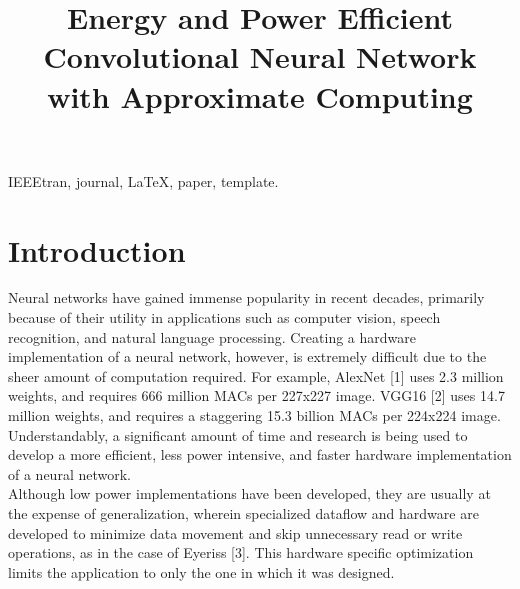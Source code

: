 \documentclass[conference]{IEEEtran}
\begin{document}
\title{Energy and Power Efficient Convolutional Neural Network with Approximate Computing}

\author{
\and
{}
}

\maketitle

\begin{abstract}
\blindtext[1]
\end{abstract}

\begin{IEEEkeywords}
IEEEtran, journal, \LaTeX, paper, template.
\end{IEEEkeywords}

\IEEEpeerreviewmaketitle

\section{Introduction}
	Neural networks have gained immense popularity in recent decades, primarily because of their utility in applications such as computer vision, speech recognition, and natural language processing. Creating a hardware implementation of a neural network, however, is extremely difficult due to the sheer amount of computation required. For example, AlexNet [1] uses 2.3 million weights, and requires 666 million MACs per 227x227 image. VGG16 [2] uses 14.7 million weights, and requires a staggering 15.3 billion MACs per 224x224 image. Understandably, a significant amount of time and research is being used to develop a more efficient, less power intensive, and faster hardware implementation of a neural network.\\
	\indent Although low power implementations have been developed, they are usually at the expense of generalization, wherein specialized dataflow and hardware are developed to minimize data movement and skip unnecessary read or write operations, as in the case of Eyeriss [3]. This hardware specific optimization limits the application to only the one in which it was designed. 
\end{document}

